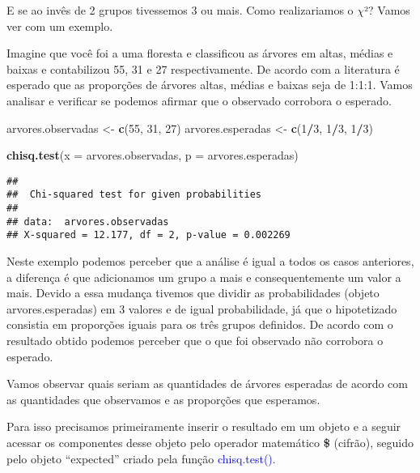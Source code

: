 \documentclass[14pt,titlepage, oneside, openany, a4paper]{book}
\newenvironment{Shaded}{\begin{snugshade}}{\end{snugshade}}
\newcommand{\DataTypeTok}[1]{\textcolor[rgb]{0.13,0.29,0.53}{#1}}
\newcommand{\DecValTok}[1]{\textcolor[rgb]{0.00,0.00,0.81}{#1}}
\newcommand{\KeywordTok}[1]{\textcolor[rgb]{0.13,0.29,0.53}{\textbf{#1}}}
\newcommand{\NormalTok}[1]{#1}
\newcommand{\OperatorTok}[1]{\textcolor[rgb]{0.81,0.36,0.00}{\textbf{#1}}}
\newcommand{\StringTok}[1]{\textcolor[rgb]{0.31,0.60,0.02}{#1}}
\begin{document}
E se ao invês de 2 grupos tivessemos 3 ou mais. Como realizariamos o \(\chi\)²? Vamos ver com um exemplo.

Imagine que você foi a uma floresta e classificou as árvores em altas, médias e baixas e contabilizou 55, 31 e 27 respectivamente. De acordo com a literatura é esperado que as proporções de árvores altas, médias e baixas seja de 1:1:1. Vamos analisar e verificar se podemos afirmar que o observado corrobora o esperado.

\begin{Shaded}
\begin{Highlighting}[]
\NormalTok{arvores.observadas <-}\StringTok{ }\KeywordTok{c}\NormalTok{(}\DecValTok{55}\NormalTok{, }\DecValTok{31}\NormalTok{, }\DecValTok{27}\NormalTok{)}
\NormalTok{arvores.esperadas <-}\StringTok{ }\KeywordTok{c}\NormalTok{(}\DecValTok{1}\OperatorTok{/}\DecValTok{3}\NormalTok{, }\DecValTok{1}\OperatorTok{/}\DecValTok{3}\NormalTok{, }\DecValTok{1}\OperatorTok{/}\DecValTok{3}\NormalTok{)}

\KeywordTok{chisq.test}\NormalTok{(}\DataTypeTok{x =}\NormalTok{ arvores.observadas, }\DataTypeTok{p =}\NormalTok{ arvores.esperadas)}
\end{Highlighting}
\end{Shaded}

\begin{verbatim}
## 
##  Chi-squared test for given probabilities
## 
## data:  arvores.observadas
## X-squared = 12.177, df = 2, p-value = 0.002269
\end{verbatim}

Neste exemplo podemos perceber que a análise é igual a todos os casos anteriores, a diferença é que adicionamos um grupo a mais e consequentemente um valor a mais. Devido a essa mudança tivemos que dividir as probabilidades (objeto arvores.esperadas) em 3 valores e de igual probabilidade, já que o hipotetizado consistia em proporções iguais para os três grupos definidos. De acordo com o resultado obtido podemos perceber que o que foi observado não corrobora o esperado.

Vamos observar quais seriam as quantidades de árvores esperadas de acordo com as quantidades que observamos e as proporções que esperamos.

Para isso precisamos primeiramente inserir o resultado em um objeto e a seguir acessar os componentes desse objeto pelo operador matemático \textbf{\$} (cifrão), seguido pelo objeto ``expected'' criado pela função \textcolor{blue}{chisq.test()}.
\end{document}
